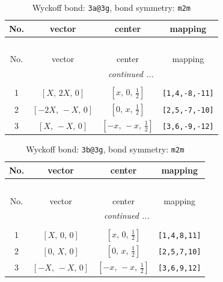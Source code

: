 \documentclass[fleqn,8pt]{jsarticle}
\begin{document}
\begin{longtable}{cccc}
\caption{Wyckoff bond: {\tt 3a@3g}, bond symmetry: {\tt m2m}}
 \\
 \hline \hline
No. & vector & center & mapping \\ \hline \endfirsthead

\multicolumn{3}{l}{\tablename\ \thetable{}} \\
 \hline \hline
No. & vector & center & mapping \\ \hline \endhead

 \hline \hline
\multicolumn{3}{r}{\footnotesize\it continued ...} \\ \endfoot

 \hline \hline
\multicolumn{3}{r}{} \\ \endlastfoot

1 & $\left[ X,\, 2 X,\, 0 \right]$ & $\left[ x,\, 0,\, \frac{1}{2} \right]$ & {\tt [1,4,-8,-11]} \\ \hline
2 & $\left[ - 2 X,\, - X,\, 0 \right]$ & $\left[ 0,\, x,\, \frac{1}{2} \right]$ & {\tt [2,5,-7,-10]} \\ \hline
3 & $\left[ X,\, - X,\, 0 \right]$ & $\left[ - x,\, - x,\, \frac{1}{2} \right]$ & {\tt [3,6,-9,-12]} \\
\end{longtable}
\renewcommand{\arraystretch}{1.2}
\begin{longtable}{cccc}
\caption{Wyckoff bond: {\tt 3b@3g}, bond symmetry: {\tt m2m}}
 \\
 \hline \hline
No. & vector & center & mapping \\ \hline \endfirsthead

\multicolumn{3}{l}{\tablename\ \thetable{}} \\
 \hline \hline
No. & vector & center & mapping \\ \hline \endhead

 \hline \hline
\multicolumn{3}{r}{\footnotesize\it continued ...} \\ \endfoot

 \hline \hline
\multicolumn{3}{r}{} \\ \endlastfoot

1 & $\left[ X,\, 0,\, 0 \right]$ & $\left[ x,\, 0,\, \frac{1}{2} \right]$ & {\tt [1,4,8,11]} \\ \hline
2 & $\left[ 0,\, X,\, 0 \right]$ & $\left[ 0,\, x,\, \frac{1}{2} \right]$ & {\tt [2,5,7,10]} \\ \hline
3 & $\left[ - X,\, - X,\, 0 \right]$ & $\left[ - x,\, - x,\, \frac{1}{2} \right]$ & {\tt [3,6,9,12]} \\
\end{longtable}
\end{document}
